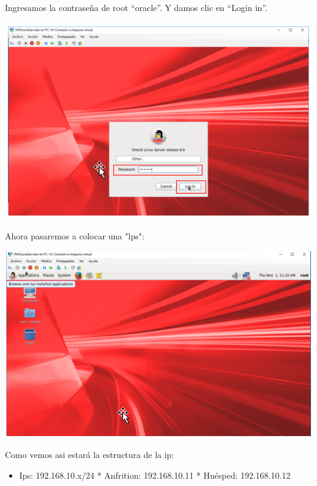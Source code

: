 \vspace{\baselineskip}

Ingresamos la contraseña de root “oracle”. Y damos clic en “Login in”.
	\begin{center}
		\includegraphics[width=15cm]{./Imagenes/29} 
	\end{center} 

\vspace{\baselineskip}

Ahora pasaremos a colocar una "lps": 
	\begin{center}
		\includegraphics[width=15cm]{./Imagenes/30} 
	\end{center} 

Como vemos asi estará la estructura de la ip:
\begin{itemize}
	\item Ips: 192.168.10.x/24  *  Anfrition: 192.168.10.11  *  Huésped: 192.168.10.12
\end{itemize}

